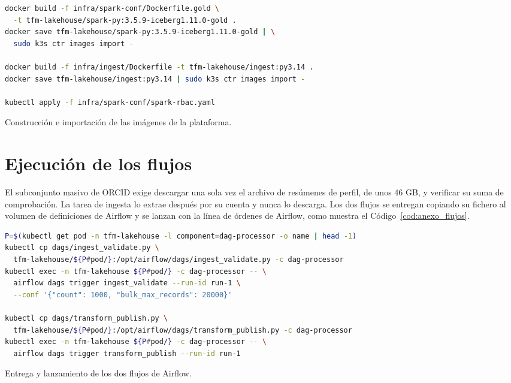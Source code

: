 \begin{code}[H]
\begin{lstlisting}[language=bash, basicstyle=\footnotesize\ttfamily, breaklines=true]
docker build -f infra/spark-conf/Dockerfile.gold \
  -t tfm-lakehouse/spark-py:3.5.9-iceberg1.11.0-gold .
docker save tfm-lakehouse/spark-py:3.5.9-iceberg1.11.0-gold | \
  sudo k3s ctr images import -

docker build -f infra/ingest/Dockerfile -t tfm-lakehouse/ingest:py3.14 .
docker save tfm-lakehouse/ingest:py3.14 | sudo k3s ctr images import -

kubectl apply -f infra/spark-conf/spark-rbac.yaml
\end{lstlisting}
\caption{Construcción e importación de las imágenes de la plataforma.}
\label{cod:anexo_imagenes}
\end{code}

\section{Ejecución de los flujos}
\label{sec:anexo_reproduccion_flujos}

El subconjunto masivo de ORCID exige descargar una sola vez el archivo de
resúmenes de perfil, de unos 46 GB, y verificar su suma de comprobación. La
tarea de ingesta lo extrae después por su cuenta y nunca lo descarga. Los
dos flujos se entregan copiando su fichero al volumen de definiciones de
Airflow y se lanzan con la línea de órdenes de Airflow, como muestra el
Código~\ref{cod:anexo_flujos}.

\begin{code}[H]
\begin{lstlisting}[language=bash, basicstyle=\footnotesize\ttfamily, breaklines=true]
P=$(kubectl get pod -n tfm-lakehouse -l component=dag-processor -o name | head -1)
kubectl cp dags/ingest_validate.py \
  tfm-lakehouse/${P#pod/}:/opt/airflow/dags/ingest_validate.py -c dag-processor
kubectl exec -n tfm-lakehouse ${P#pod/} -c dag-processor -- \
  airflow dags trigger ingest_validate --run-id run-1 \
  --conf '{"count": 1000, "bulk_max_records": 20000}'

kubectl cp dags/transform_publish.py \
  tfm-lakehouse/${P#pod/}:/opt/airflow/dags/transform_publish.py -c dag-processor
kubectl exec -n tfm-lakehouse ${P#pod/} -c dag-processor -- \
  airflow dags trigger transform_publish --run-id run-1
\end{lstlisting}
\caption{Entrega y lanzamiento de los dos flujos de Airflow.}
\label{cod:anexo_flujos}
\end{code}

